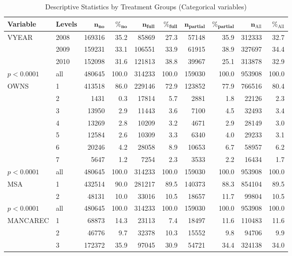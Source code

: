 \documentclass[11pt, oneside]{article}        %
\begin{document}
\begin{table}[ht]
\centering
\caption{Descriptive Statistics by Treatment Groups (Categorical variables)} 
{\footnotesize
\begin{tabular}{ll|rr|rr|rr|rr}
 \textbf{Variable} & \textbf{Levels} & $\mathbf{n_{no}}$ & $\mathbf{\%_{no}}$ & $\mathbf{n_{full}}$ & $\mathbf{\%_{full}}$ & $\mathbf{n_{partial}}$ & $\mathbf{\%_{partial}}$ & $\mathbf{n_{\mathrm{All}}}$ & $\mathbf{\%_{\mathrm{All}}}$ \\ 
  \hline
VYEAR & 2008 & 169316 & 35.2 & 85869 & 27.3 & 57148 & 35.9 & 312333 & 32.7 \\ 
   & 2009 & 159231 & 33.1 & 106551 & 33.9 & 61915 & 38.9 & 327697 & 34.4 \\ 
   & 2010 & 152098 & 31.6 & 121813 & 38.8 & 39967 & 25.1 & 313878 & 32.9 \\ 
   \hline
$p< 0.0001$ & all & 480645 & 100.0 & 314233 & 100.0 & 159030 & 100.0 & 953908 & 100.0 \\ 
   \hline
\hline
OWNS & 1 & 413518 & 86.0 & 229146 & 72.9 & 123852 & 77.9 & 766516 & 80.4 \\ 
   & 2 & 1431 & 0.3 & 17814 & 5.7 & 2881 & 1.8 & 22126 & 2.3 \\ 
   & 3 & 13950 & 2.9 & 11443 & 3.6 & 7100 & 4.5 & 32493 & 3.4 \\ 
   & 4 & 13269 & 2.8 & 10209 & 3.2 & 4671 & 2.9 & 28149 & 3.0 \\ 
   & 5 & 12584 & 2.6 & 10309 & 3.3 & 6340 & 4.0 & 29233 & 3.1 \\ 
   & 6 & 20246 & 4.2 & 28058 & 8.9 & 10653 & 6.7 & 58957 & 6.2 \\ 
   & 7 & 5647 & 1.2 & 7254 & 2.3 & 3533 & 2.2 & 16434 & 1.7 \\ 
   \hline
$p< 0.0001$ & all & 480645 & 100.0 & 314233 & 100.0 & 159030 & 100.0 & 953908 & 100.0 \\ 
   \hline
\hline
MSA & 1 & 432514 & 90.0 & 281217 & 89.5 & 140373 & 88.3 & 854104 & 89.5 \\ 
   & 2 & 48131 & 10.0 & 33016 & 10.5 & 18657 & 11.7 & 99804 & 10.5 \\ 
   \hline
$p< 0.0001$ & all & 480645 & 100.0 & 314233 & 100.0 & 159030 & 100.0 & 953908 & 100.0 \\ 
   \hline
\hline
MANCAREC & 1 & 68873 & 14.3 & 23113 & 7.4 & 18497 & 11.6 & 110483 & 11.6 \\ 
   & 2 & 46776 & 9.7 & 32378 & 10.3 & 15552 & 9.8 & 94706 & 9.9 \\ 
   & 3 & 172372 & 35.9 & 97045 & 30.9 & 54721 & 34.4 & 324138 & 34.0 \\ 

\end{tabular}}
\end{table}
\end{document}

